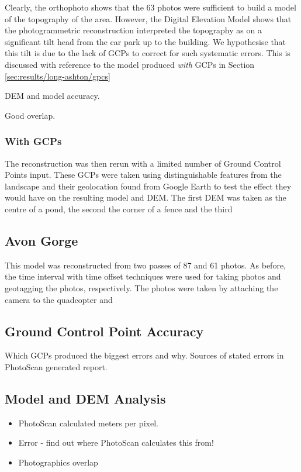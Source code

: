 Clearly, the orthophoto shows that the 63 photos were sufficient to build a
model of the topography of the area. However, the Digital Elevation Model shows
that the photogrammetric reconstruction interpreted the topography as on a
significant tilt head from the car park up to the building. We hypothesise that
this tilt is due to the lack of GCPs to correct for such systematic errors. This
is discussed with reference to the model produced \textit{with} GCPs in Section
\ref{sec:results/long-ashton/gpcs}

DEM and model accuracy.

Good overlap.

\subsubsection{With GCPs}
\label{sec:results/long-ashton/gcps}

The reconstruction was then rerun with a limited number of Ground Control Points
input. These GCPs were taken using distinguishable features from the landscape
and their geolocation found from Google Earth to test the effect they would have
on the resulting model and DEM. The first DEM was taken as the centre of a pond,
the second the corner of a fence and the third

\subsection{Avon Gorge}

This model was reconstructed from two passes of 87 and 61 photos. As before, the
time interval with time offset techniques were used for taking photos and
geotagging the photos, respectively. The photos were taken by attaching the
camera to the quadcopter and 

\subsection{Ground Control Point Accuracy}

Which GCPs produced the biggest errors and why. Sources of stated errors in
PhotoScan generated report.

\subsection{Model and DEM Analysis}

\begin{itemize}

    \item PhotoScan calculated meters per pixel.

    \item Error - find out where PhotoScan calculates this from!

    \item Photographics overlap

\end{itemize}
